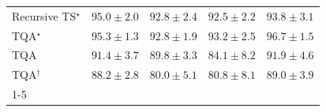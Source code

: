 \begin{tabular}{l|cccc|}
Recursive TS$^\star$ & {\cellcolor[HTML]{045B8E}} \color[HTML]{F1F1F1} $95.0\pm 2.0$ & {\cellcolor[HTML]{0569A5}} \color[HTML]{F1F1F1} $92.8\pm 2.4$ & {\cellcolor[HTML]{056BA7}} \color[HTML]{F1F1F1} $92.5\pm 2.2$ & {\cellcolor[HTML]{04629A}} \color[HTML]{F1F1F1} $93.8\pm 3.1$ \\
TQA$^\star$ & {\cellcolor[HTML]{04598C}} \color[HTML]{F1F1F1} $95.3\pm 1.3$ & {\cellcolor[HTML]{0569A5}} \color[HTML]{F1F1F1} $92.8\pm 1.9$ & {\cellcolor[HTML]{0567A1}} \color[HTML]{F1F1F1} $93.2\pm 2.5$ & {\cellcolor[HTML]{034B76}} \color[HTML]{F1F1F1} $96.7\pm 1.5$ \\
TQA & {\cellcolor[HTML]{0872B1}} \color[HTML]{F1F1F1} $91.4\pm 3.7$ & {\cellcolor[HTML]{2081B9}} \color[HTML]{F1F1F1} $89.8\pm 3.3$ & {\cellcolor[HTML]{7DACD1}} \color[HTML]{F1F1F1} $84.1\pm 8.2$ & {\cellcolor[HTML]{056FAE}} \color[HTML]{F1F1F1} $91.9\pm 4.6$ \\
TQA$^\dagger$ & {\cellcolor[HTML]{3790C0}} \color[HTML]{F1F1F1} $88.2\pm 2.8$ & {\cellcolor[HTML]{B5C4DF}} \color[HTML]{000000} $80.0\pm 5.1$ & {\cellcolor[HTML]{ACC0DD}} \color[HTML]{000000} $80.8\pm 8.1$ & {\cellcolor[HTML]{2C89BD}} \color[HTML]{F1F1F1} $89.0\pm 3.9$ \\
\cline{1-5}
\bottomrule
\end{tabular}
